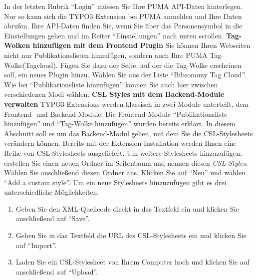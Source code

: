 \newline
\newline
In der letzten Rubrik \enquote{Login} müssen Sie Ihre PUMA API-Daten hinterlegen. Nur so kann sich die TYPO3 Extension bei PUMA anmelden und Ihre Daten abrufen. Ihre API-Daten finden Sie, wenn Sie über das Personensymbol in die Einstellungen gehen und im Reiter \enquote{Einstellungen} nach unten scrollen. \newline
\newline
\textbf{Tag-Wolken hinzufügen mit dem Frontend Plugin}\newline\newline
Sie können Ihren Webseiten nicht nur Publikationslisten hinzufügen, sondern auch Ihre PUMA  Tag-Wolke(Tagcloud). Fügen Sie dazu der Seite, auf der die Tag-Wolke erscheinen soll, ein neues Plugin hinzu. Wählen Sie aus der Liste \enquote{Bibsonomy Tag Cloud}.\newline \newline 
Wie bei \enquote{Publikationsliste hinzufügen} können Sie auch hier zwischen verschiedenen Modi wählen.\newline \newline 
\textbf{CSL Styles mit dem Backend-Module verwalten}\newline
\newline
TYPO3-Extensions werden klassisch in zwei Module unterteilt, dem Frontend- und Backend-Module. Die Frontend-Module \enquote{Publikationsliste hinzufügen} und \enquote{Tag-Wolke hinzufügen} wurden bereits erklärt. In diesem Abschnitt soll es um das Backend-Modul gehen, mit dem Sie die CSL-Stylesheets verändern können.\newline \newline
Bereits mit der Extension-Installation werden Ihnen eine Reihe von CSL-Stylesheets ausgeliefert. Um weitere Stylesheets hinzuzufügen, erstellen Sie einen neuen Ordner im Seitenbaum und nennen diesen \textit{CSL Styles}. Wählen Sie anschließend diesen Ordner aus. Klicken Sie auf \enquote{Neu} und wählen \enquote{Add a custom style}.\newline \newline
Um ein neue Stylesheets hinzuzufügen gibt es drei unterschiedliche Möglichkeiten:
\begin{enumerate}
\item Geben Sie den XML-Quellcode direkt in das Textfeld ein und klicken Sie anschließend auf \enquote{Save}.
\item Geben Sie in das Textfeld die URL des CSL-Stylesheets ein und klicken Sie auf \enquote{Import}.
\item Laden Sie ein CSL-Stylesheet von Ihrem Computer hoch und klicken Sie auf anschließend auf \enquote{Upload}. 
\end{enumerate}
